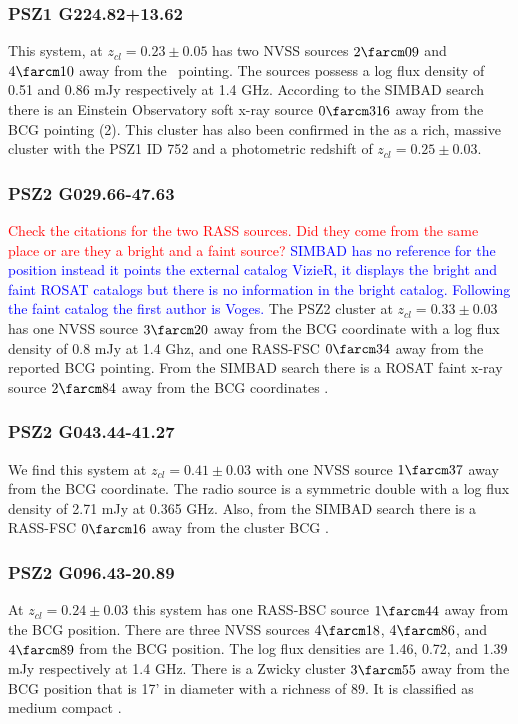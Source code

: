 \documentclass[apj, revtex4-1]{emulateapj}
\newcommand{\editorial}[1]{\textcolor{red}{#1}}
\newcommand{\peditorial}[1]{\textcolor{blue}{#1}}
\begin{document}
\subsubsection{PSZ1 G224.82+13.62}
This system, at $z_{cl} = 0.23 \pm 0.05$ has two NVSS sources $2\farcm09$ and $4\farcm10$ away from the \planck\ pointing. The sources possess a log flux density of 0.51 and 0.86 mJy respectively at 1.4 GHz. According to the SIMBAD search there is an Einstein Observatory soft x-ray source $0\farcm316$ away from the BCG pointing (2). This cluster has also been confirmed in the \citep{Barrena2018} as a rich, massive cluster with the PSZ1 ID 752 and a photometric redshift of $z_{cl} = 0.25 \pm 0.03$.

\subsubsection{PSZ2 G029.66-47.63}
\editorial{Check the citations for the two RASS sources. Did they come from the same place or are they a bright and a faint source?}
\peditorial{SIMBAD has no reference for the position instead it points the external catalog VizieR, it displays the bright and faint ROSAT catalogs but there is no information in the bright catalog. Following the faint catalog the first author is Voges.}
The PSZ2 cluster at $z_{cl} = 0.33 \pm 0.03$ has one NVSS source $3\farcm20$ away from the BCG coordinate with a log flux density of 0.8 mJy at 1.4 Ghz, and one RASS-FSC $0\farcm34$ away from the reported BCG pointing. From the SIMBAD search there is a ROSAT faint x-ray source $2\farcm84$ away from the BCG coordinates \citep{Bohringer2000}.

\subsubsection{PSZ2 G043.44-41.27}
We find this system at $z_{cl} = 0.41 \pm 0.03$ with one NVSS source $1\farcm37$ away from the BCG coordinate. The radio source is a symmetric double with a log flux density of 2.71 mJy at 0.365 GHz. Also, from the SIMBAD search there is a RASS-FSC $0\farcm16$ away from the cluster BCG \citep{Bohringer2000}.

\subsubsection{PSZ2 G096.43-20.89}
At $z_{cl} = 0.24 \pm 0.03$ this system has one RASS-BSC source $1\farcm44$ away from the BCG position. There are three NVSS sources $4\farcm18$, $4\farcm86$, and $4\farcm89$ from the BCG position. The log flux densities are 1.46, 0.72, and 1.39 mJy respectively at 1.4 GHz. There is a Zwicky cluster $3\farcm55$ away from the BCG position that is 17' in diameter with a richness of 89. It is classified as medium compact \citep{Zwicky1968}.
\end{document}
